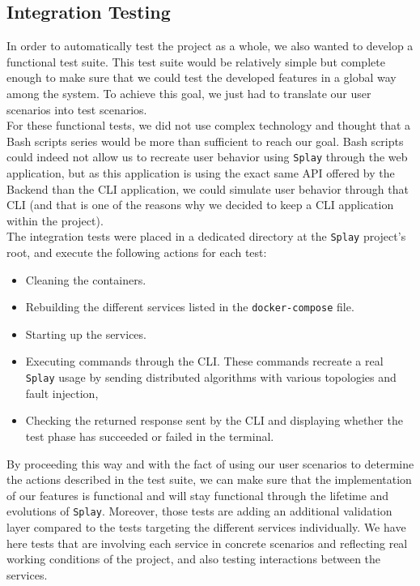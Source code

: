 \documentclass{eplmastersthesis}
\begin{document}
      \subsection{Integration Testing}

        In order to automatically test the project as a whole, we also wanted to
        develop a functional test suite. This test suite would be relatively
        simple but complete enough to make sure that we could test the developed
        features in a global way among the system. To achieve this goal, we
        just had to translate our user scenarios into test scenarios.\\

        For these functional tests, we did not use complex technology and
        thought that a Bash scripts series would be more than sufficient to
        reach our goal. Bash scripts could indeed not allow us to recreate user
        behavior using \texttt{Splay} through the web application, but as this
        application is using the exact same API offered by the Backend than the
        CLI application, we could simulate user behavior through that CLI (and
        that is one of the reasons why we decided to keep a CLI application
        within the project).\\

        The integration tests were placed in a dedicated directory at the \texttt{Splay}
        project's root, and execute the following actions for each test:

        \begin{itemize}
          \item Cleaning the containers.
          \item Rebuilding the different services listed in the \texttt{docker-compose}
          file.
          \item Starting up the services.
          \item Executing commands through the CLI. These commands recreate
          a real \texttt{Splay} usage by sending distributed algorithms with
          various topologies and fault injection,
          \item Checking the returned response sent by the CLI and displaying
          whether the test phase has succeeded or failed in the terminal.
        \end{itemize}

        By proceeding this way and with the fact of using our user scenarios to
        determine the actions described in the test suite, we can make sure
        that the implementation of our features is functional and will stay
        functional through the lifetime and evolutions of \texttt{Splay}. Moreover, those
        tests are adding an additional validation layer compared to the tests
        targeting the different services individually. We have here tests that
        are involving each service in concrete scenarios and reflecting real
        working conditions of the project, and also testing interactions
        between the services.
\end{document}

